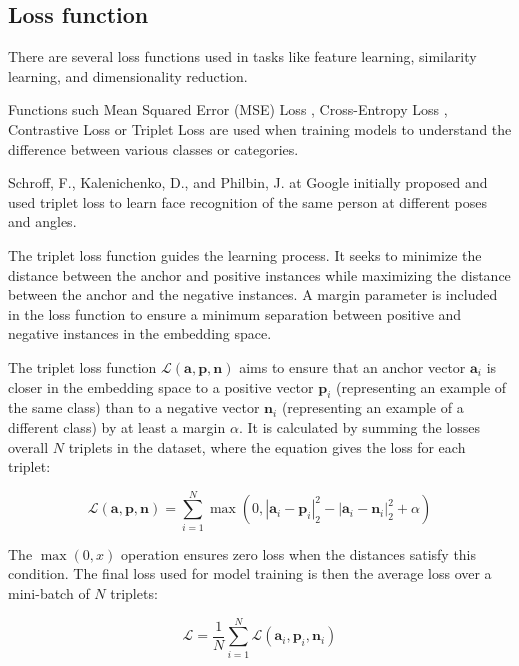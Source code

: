\subsection{Loss function}

There are several loss functions used in tasks like feature learning, similarity learning, and dimensionality reduction. 

Functions such Mean Squared Error (MSE) Loss \cite{Hodson2021MeanDeconstructed}, Cross-Entropy Loss \cite{Zhang2018GeneralizedLabels}, Contrastive Loss \cite{supercontrast} or Triplet Loss are used when training models to understand the difference between various classes or categories.

Schroff, F., Kalenichenko, D., and Philbin, J. at Google initially proposed and used triplet loss to learn face recognition of the same person at different poses and angles. \cite{Schroff2015FaceNet:Clustering}

The triplet loss function guides the learning process. It seeks to minimize the distance between the anchor and positive instances while maximizing the distance between the anchor and the negative instances. A margin parameter is included in the loss function to ensure a minimum separation between positive and negative instances in the embedding space.

The triplet loss function $\mathcal{L}(\mathbf{a}, \mathbf{p}, \mathbf{n})$ aims to ensure that an anchor vector $\mathbf{a}_i$ is closer in the embedding space to a positive vector $\mathbf{p}_i$ (representing an example of the same class) than to a negative vector $\mathbf{n}_i$ (representing an example of a different class) by at least a margin $\alpha$. It is calculated by summing the losses overall $N$ triplets in the dataset, where the equation gives the loss for each triplet:

\begin{equation}
\mathcal{L}(\mathbf{a}, \mathbf{p}, \mathbf{n}) = \sum_{i=1}^{N} \max \left(0, \left| \mathbf{a}_i - \mathbf{p}_i \right|_2^2 - \left| \mathbf{a}_i - \mathbf{n}_i \right|_2^2 + \alpha \right)
\end{equation}

The $\max(0, x)$ operation ensures zero loss when the distances satisfy this condition. The final loss used for model training is then the average loss over a mini-batch of $N$ triplets:

\begin{equation}
\mathcal{L} = \frac{1}{N} \sum_{i=1}^{N} \mathcal{L}(\mathbf{a}_i, \mathbf{p}_i, \mathbf{n}_i)
\end{equation}


